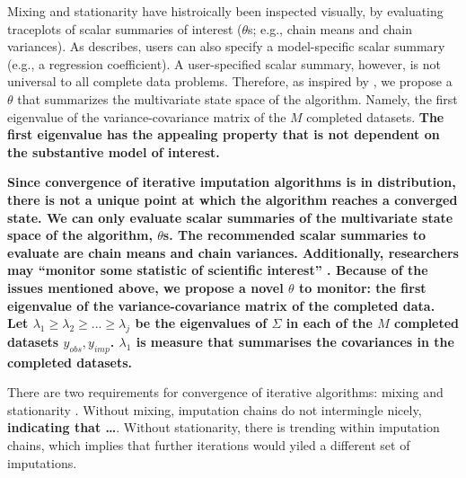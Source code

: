 \documentclass[Royal,times,sageh]{sagej}
\begin{document}
Mixing and stationarity have histroically been inspected visually, by
evaluating traceplots of scalar summaries of interest (\(\theta\)s;
e.g., chain means and chain variances). As \citet{buur18} describes,
users can also specify a model-specific scalar summary (e.g., a
regression coefficient). A user-specified scalar summary, however, is
not universal to all complete data problems. Therefore, as inspired by
\citep{mack03}, we propose a \(\theta\) that summarizes the multivariate
state space of the algorithm. Namely, the first eigenvalue of the
variance-covariance matrix of the \(M\) completed datasets. \textbf{The
first eigenvalue has the appealing property that is not dependent on the
substantive model of interest.}

\textbf{Since convergence of iterative imputation algorithms is in
distribution, there is not a unique point at which the algorithm reaches
a converged state. We can only evaluate scalar summaries of the
multivariate state space of the algorithm, \(\theta\)s. The recommended
scalar summaries to evaluate are chain means and chain variances.
Additionally, researchers may ``monitor some statistic of scientific
interest'' \citep[\(\S\) 6.5.2]{buur18}. Because of the issues mentioned
above, we propose a novel \(\theta\) to monitor: the first eigenvalue of
the variance-covariance matrix of the completed data. Let
\(\lambda_1 \geq \lambda_2 \geq ... \geq \lambda_j\) be the eigenvalues
of \(\Sigma\) in each of the \(M\) completed datasets
\({y_{obs}, y_{imp}}\). \(\lambda_1\) is measure that summarises the
covariances in the completed datasets.}

There are two requirements for convergence of iterative algorithms:
mixing and stationarity \citep{gelm13}. Without mixing, imputation
chains do not intermingle nicely, \textbf{indicating that \ldots{}}.
Without stationarity, there is trending within imputation chains, which
implies that further iterations would yiled a different set of
imputations.
\end{document}
